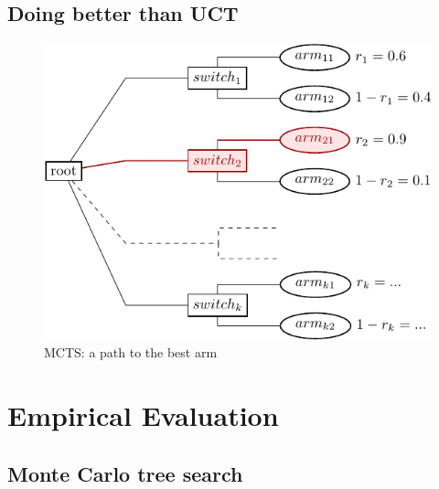 \documentclass{article}
\begin{document}


\subsection{Doing better than UCT}

\begin{figure}[t]
  \centering
  \includegraphics[scale=1.2]{twolevel-tree.pdf}
  \caption{MCTS: a path to the best arm}
  \label{fig:twolevel-tree}
\end{figure}


\section{Empirical Evaluation}

\subsection{Monte Carlo tree search}

\end{document}
